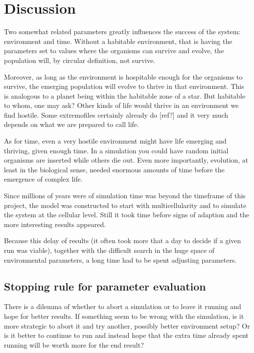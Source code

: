 \chapter{Discussion}


Two somewhat related parameters greatly influences the success of the system: environment and time. Without a habitable environment, that is having the parameters set to values where the organisms can survive and evolve, the population will, by circular definition, not survive.

Moreover, as long as the environment is hospitable enough for the organisms to survive, the emerging population will evolve to thrive in that environment. This is analogous to a planet being within the habitable zone of a star. But habitable to whom, one may ask? Other kinds of life would thrive in an environment we find hostile. Some extremofiles certainly already do [ref?] and it very much depends on what we are prepared to call life.

As for time, even a very hostile environment might have life emerging and thriving, given enough time. In a simulation you could have random initial organisms are inserted while others die out. Even more importantly, evolution, at least in the biological sense, needed enormous amounts of time before the emergence of complex life.


Since millions of years were of simulation time was beyond the timeframe of this project, the model was constructed to start with multicellularity and to simulate the system at the cellular level. Still it took time before signs of adaption and the more interesting results appeared.

Because this delay of results (it often took more that a day to decide if a given run was viable), together with the difficult search in the huge space of environmental parameters, a long time had to be spent adjusting parameters.

\section{Stopping rule for parameter evaluation}
There is a dilemma of whether to abort a simulation or to leave it running and hope for better results. If something seem to be wrong with the simulation, is it more strategic to abort it and try another, possibly better environment setup? Or is it better to continue to run and instead hope that the extra time already spent running will be worth more for the end result?

